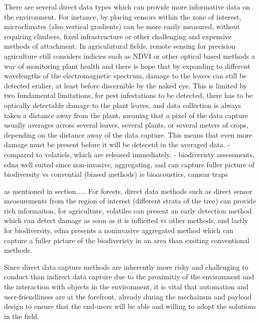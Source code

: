 There are several direct data types which can provide more informative data on the environment. For instance, by placing sensors within the zone of interest, microclimates (also vertical gradients) can be more easily measured, without requiring climbers, fixed infrastructure or other challenging and expensive methods of attachment. In agriculutural fields, remote sensing for precision agriculture still considers indicies such as NDVI or other optical based methods a way of monitoring plant health and there is hope that by expanding to different wavelengths of the electromagnetic spectrum, damage to the leaves can still be detected eralier, at least before discernible by the naked eye. This is limited by two fundamental limitations, for pest infestations to be detected, there has to be optically detectable damage to the plant leaves, and data collection is always taken a distance away from the plant, meaning that a pixel of the data capture usually averages across several leaves, several plants, or several meters of crops, depending on the distance away of the data capture. This means that even more damage must be present before it will be detecetd in the averaged data. 
- compared to volatiels, which are released immediately.
- biodiveristy assessments, edna well suited since non-invasive, aggregating, and can capture fuller picture of biodiversity vs convential (biased methods) ie bioacoustics, camear traps

as mentioned in section.....
For forests, direct data methods such as direct sensor measurements from the region of interest (different strata of the tree) can provide rich informaiton, for agriculture, volatiles can present an early detection method which can detect damage as soon as it is inflicited vs other methods, and lastly for biodiversity, edna presents a noninvasive aggregated method which can capture a fuller picture of the biodiveristy in an area than exsiting conventional methods.

Since direct data capture methods are inherently more risky and challenging to conduct than indirect data capture due to the proximitiy of the enviromnent and the interaction with objects in the environment, it is vital that automation and user-friendliness are at the forefront, already during the mechainsm and payload design to ensure that the end-users will be able and willing to adopt the solutions in the field.



 


